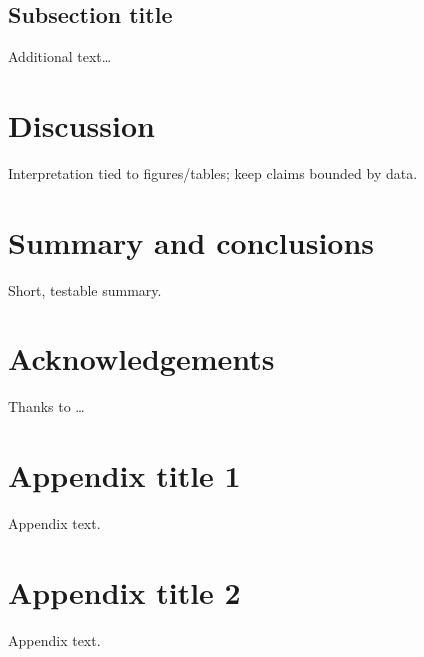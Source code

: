 \documentclass[final,5p,times,authoryear]{elsarticle}
\begin{document}

\subsection{Subsection title}
Additional text…

\section{Discussion}
Interpretation tied to figures/tables; keep claims bounded by data.

\section{Summary and conclusions}
Short, testable summary.

\section*{Acknowledgements}
Thanks to …

\appendix
\section{Appendix title 1}
Appendix text.

\section{Appendix title 2}
Appendix text.




\end{document}
